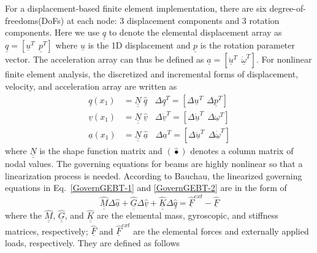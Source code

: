 \documentclass{aiaa-tc}
\newcommand{\tens}[1]{\underline{\underline{#1}}}
\renewcommand{\vec}[1]{\underline{#1}}
\begin{document}
For a displacement-based finite element implementation, there are six
degree-of-freedoms(DoFs) at each node: 3 displacement components and 3
rotation components. Here we use $\vec{q}$ to denote the elemental
displacement array as $\underline{q}=\left[
\underline{u}^T~~\underline{p}^T\right]$ where $\vec{u}$ is the 1D
displacement and $\vec{p}$ is the rotation parameter vector. The
acceleration array can thus be defined as $\underline{a}=\left[
\ddot{\underline{u}}^T~~ \dot{\underline{\omega}}^T \right]$. For nonlinear
finite element analysis, the discretized and incremental forms of
displacement, velocity, and acceleration array are written as
\begin{align}
	\label{Discretized}
	\underline{q} (x_1) &= \underline{\underline{N}} ~\hat{\underline{q}}~~~~\Delta \underline{q}^T = \left[ \Delta \underline{u}^T~~\Delta \underline{p}^T \right] \\
	\underline{v}(x_1) &= \underline{\underline{N}}~\hat{\underline{v}}~~~~\Delta \underline{\dot{v}}^T = \left[\Delta \underline{\dot{u}}^T~~\Delta \underline{\omega}^T \right] \\
	\underline{a}(x_1) &= \underline{\underline{N}}~ \hat{\underline{a}}~~~~\Delta \underline{a}^T = \left[ \Delta \ddot{\underline{u}}^T~~\Delta \dot{\underline{\omega}}^T \right]	
\end{align}
where $\tens{N}$ is the shape function matrix and $(\hat{\bullet})$ denotes
a column matrix of nodal values.  The governing equations for beams are
highly nonlinear so that a linearization process is needed. According to
Bauchau\cite{Bauchau:2010}, the linearized governing equations in
Eq.~\eqref{GovernGEBT-1} and \eqref{GovernGEBT-2} are in the form of
\begin{equation}
	\label{LinearizedEqn}
	\hat{\underline{\underline{M}}} \Delta \hat{\underline{a}} +\hat{\underline{\underline{G}}} \Delta \hat{\underline{v}}+ \hat{\underline{\underline{K}}} \Delta \hat{\underline{q}} = \hat{\underline{F}}^{ext} - \hat{\underline{F}}
\end{equation} 
where the $\hat{\tens{M}}$, $\hat{\tens{G}}$, and $\hat{\tens{K}}$ are the
elemental mass, gyroscopic, and stiffness matrices, respectively;
$\hat{\vec{F}}$ and $\hat{\vec{F}}^{ext}$ are the elemental forces and
externally applied loads, respectively. They are defined as follows
\end{document}
